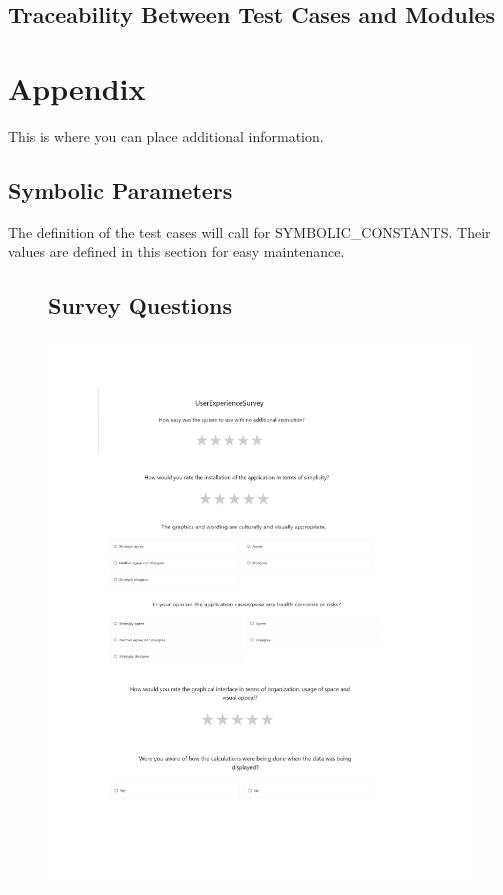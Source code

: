 \documentclass[12pt, titlepage]{article}
\begin{document}
\subsection{Traceability Between Test Cases and Modules}

				




\newpage

\section{Appendix}

This is where you can place additional information.

\subsection{Symbolic Parameters}

The definition of the test cases will call for SYMBOLIC\_CONSTANTS.
Their values are defined in this section for easy maintenance.


\begin{figure}
  \subsection{Survey Questions}
  \centering
  \includegraphics[width=1\textwidth]{UserExperienceSurvey.pdf}
\end{figure}
\end{document}
